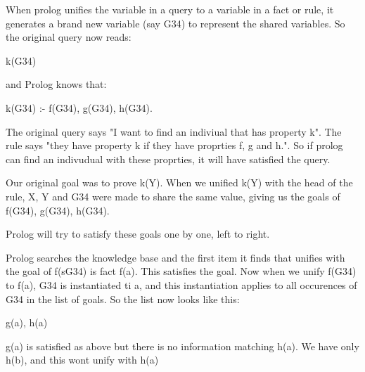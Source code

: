 \documentclass{article}
\begin{document}
When prolog unifies the variable in a query to a variable in a fact or rule, it generates a brand new variable (say \textunderscore G34) to represent the shared variables. So the original query now reads:

k(\textunderscore G34)

and Prolog knows that:

k(\textunderscore G34)  :-  f(\textunderscore G34),  g(\textunderscore G34),  h(\textunderscore G34).

The original query says "I want to find an indiviual that has property k". The rule says "they have property k if they have proprties f, g and h.". So if prolog can find an indivudual with these proprties, it will have satisfied the query.

Our original goal was to prove k(Y). When we unified k(Y) with the head of the rule, X, Y and \textunderscore G34 were made to share the same value, giving us the goals of f(\textunderscore G34), g(\textunderscore G34), h(\textunderscore G34).

Prolog will try to satisfy these goals one by one, left to right.

Prolog searches the knowledge base and the first item it finds that unifies with the goal of f(\textunderscore sG34) is fact f(a). This satisfies the goal. Now when we unify f(\textunderscore G34) to f(a), \textunderscore G34 is instantiated ti a, and this instantiation applies to all occurences of \textunderscore G34 in the list of goals. So the list now looks like this:

g(a), h(a)

g(a) is satisfied as above but there is no information matching h(a). We have only h(b), and this wont unify with h(a)
\end{document}
